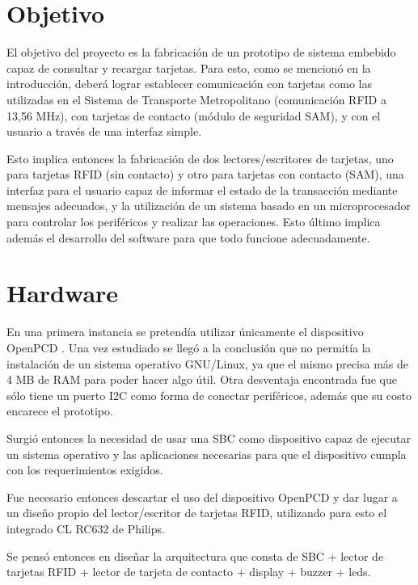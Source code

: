 \documentclass[%
        final,
        notitlepage,
        narroweqnarray,
        inline,
        ]{ieee}
\begin{document}
\section{Objetivo}
El objetivo del proyecto es la fabricación de un prototipo de sistema embebido capaz de consultar y recargar tarjetas. Para esto, como se mencionó en la introducción, deberá lograr establecer comunicación con tarjetas  como las utilizadas en el Sistema de Transporte Metropolitano (comunicación RFID a 13,56 MHz), con tarjetas de contacto (módulo de seguridad SAM), y con el usuario a través de una interfaz simple.


Esto implica entonces la fabricación de dos lectores/escritores de tarjetas, uno para tarjetas RFID (sin contacto) y
otro para tarjetas con contacto (SAM), una interfaz para el usuario capaz de informar el estado de la transacción
mediante mensajes adecuados, y la utilización de un sistema basado en un microprocesador para controlar los periféricos
y realizar las operaciones. Esto último implica además el desarrollo del software para que todo funcione adecuadamente.



\section{Hardware}
En una primera instancia se pretendía utilizar únicamente el dispositivo OpenPCD \cite{OpenPCD}. Una vez estudiado se llegó a la conclusión que no permitía la instalación de un sistema operativo GNU/Linux, ya que el mismo precisa más de 4 MB de RAM para poder hacer algo útil. Otra desventaja encontrada fue que sólo tiene un puerto I2C como forma de conectar periféricos, además que su costo encarece el prototipo.

Surgió entonces la necesidad de usar una SBC como dispositivo capaz de ejecutar un sistema operativo y las aplicaciones necesarias para que el dispositivo cumpla con los requerimientos exigidos.

Fue necesario entonces descartar el uso del dispositivo OpenPCD y dar lugar a un diseño propio del lector/escritor de tarjetas RFID, utilizando para esto el integrado CL RC632 de Philips.

Se pensó entonces en diseñar la arquitectura que consta de SBC + lector de tarjetas RFID + lector de tarjeta de contacto + display + buzzer + leds.
\end{document}
